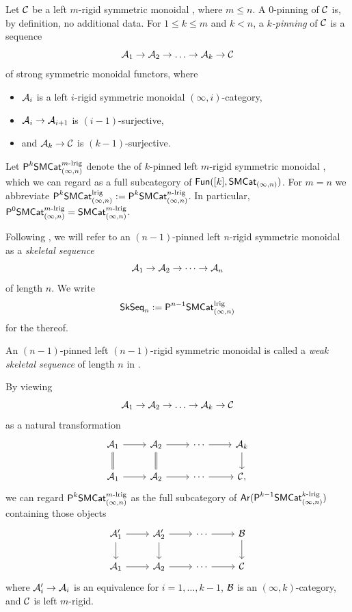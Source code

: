 \documentclass[a4paper,11pt]{article}
\begin{document}
\begin{defn}
  Let $\nC$ be a left $m$-rigid symmetric monoidal \incat{}, where $m
  \leq n$. A $0$-pinning of $\nC$ is, by definition, no additional
  data. For $1 \leq k \leq m$ and $k<n$, a
  \emph{$k$-pinning} of $\nC$ is a sequence
  \[ \nA_{1} \to \nA_{2} \to \dots \to \nA_{k} \to \nC \] of strong
  symmetric monoidal functors, where
  \begin{itemize}
  \item   $\nA_{i}$ is a left $i$-rigid
  symmetric monoidal $(\infty,i)$-category,
\item  $\nA_{i} \to \nA_{i+1}$ is $(i-1)$-surjective,
\item and $\nA_{k} \to \nC$ is $(k-1)$-surjective.
  \end{itemize}
 Let $\PSMCatIn[k]^{m\dlrig}$ denote the \icat{} of
  $k$-pinned left $m$-rigid symmetric monoidal \incats{}, which we can
  regard as a full subcategory of $\Fun([k], \SMCatIn)$. For $m = n$
  we abbreviate $\PSMCatIn[k]^{\lrig} := \PSMCatIn[k]^{n\dlrig}$.
  In particular, $\PSMCatIn[0]^{m\dlrig}=\SMCatIn^{m\dlrig}$.
\end{defn}

\begin{defn}
  Following \cite{LurieCob}, we will refer to an $(n-1)$-pinned left $n$-rigid symmetric
  monoidal \incat{} as a \emph{skeletal sequence}
  \[ \nA_{1} \to \nA_{2} \to \cdots \to \nA_{n}\]
  of length $n$. We write
  \[ \SkSeq_{n} := \PSMCatIn[n-1]^{\lrig}  \]
  for the \icat{} thereof.
\end{defn}

\begin{remark}
  An $(n-1)$-pinned left $(n-1)$-rigid symmetric monoidal \incat{} is
  called a \emph{weak skeletal sequence} of length $n$ in
  \cite{LurieCob}.
\end{remark}


\begin{observation}\label{obs:k-pinning as arrow}
  By viewing
  \[ \nA_{1} \to \nA_{2} \to \dots \to \nA_{k} \to \nC \]
  as a natural transformation
  \[
    \begin{tikzcd}
     \nA_{1} \ar[r] \ar[d, equals] &  \nA_{2} \ar[r] \ar[d, equals] &
     \cdots  \ar[r]  &  \nA_{k} \ar[d] \\
     \nA_{1} \ar[r] &  \nA_{2} \ar[r] &
     \cdots  \ar[r]  &  \nC,
    \end{tikzcd}
  \]
  we can regard $\PSMCatIn[k]^{m\dlrig}$ as the full subcategory of
  $\Ar(\PSMCatIn[k-1]^{k\dlrig})$ containing those objects
    \[
    \begin{tikzcd}
     \nA_{1}' \ar[r] \ar[d] &  \nA_{2}' \ar[r] \ar[d] &
     \cdots  \ar[r]  &  \nB \ar[d] \\
     \nA_{1} \ar[r] &  \nA_{2} \ar[r] &
     \cdots  \ar[r]  &  \nC
    \end{tikzcd}
  \]  
  where $\nA_{i}' \to \nA_{i}$ is an equivalence for $i=1,\ldots,k-1$,
  $\nB$ is an $(\infty,k)$-category, and $\nC$ is left $m$-rigid.
\end{observation}
\end{document}
